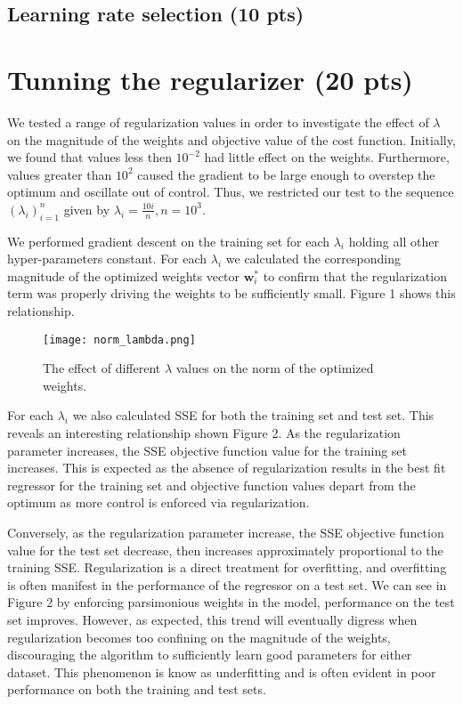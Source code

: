 \documentclass{article}
\renewcommand{\vec}[1]{\mathbf{#1}}
\begin{document}
\subsection{Learning rate selection (10 pts)}

\section{Tunning the regularizer (20 pts)}

We tested a range of regularization values in order to investigate the effect of $\lambda$ on the magnitude of the weights and objective value of the cost function. Initially, we found that values less then $10^{-2}$ had little effect on the weights. Furthermore, values greater than $10^2$ caused the gradient to be large enough to overstep the optimum and oscillate out of control. Thus, we restricted our test to the sequence $(\lambda_i)_{i=1}^{n}$ given by $\lambda_i = \frac{10i}{n}, n = 10^3$.

We performed gradient descent on the training set for each $\lambda_i$ holding all other hyper-parameters constant. For each $\lambda_i$ we calculated the corresponding magnitude of the optimized weights vector $\vec{w}_i^*$ to confirm that the regularization term was properly driving the weights to be sufficiently small. Figure 1 shows this relationship.

\begin{figure}[t]
\centering
\texttt{[image: norm\_lambda.png]}
\caption{The effect of different $\lambda$ values on the norm of the optimized weights.}
\end{figure}

For each $\lambda_i$ we also calculated SSE for both the training set and test set. This reveals an interesting relationship shown Figure 2. As the regularization parameter increases, the SSE objective function value for the training set increases. This is expected as the absence of regularization results in the best fit regressor for the training set and objective function values depart from the optimum as more control is enforced via regularization. 

Conversely, as the regularization parameter increase, the SSE objective function value for the test set decrease, then increases approximately proportional to the training SSE. Regularization is a direct treatment for overfitting, and overfitting is often manifest in the performance of the regressor on a test set. We can see in Figure 2 by enforcing parsimonious weights in the model, performance on the test set improves. However, as expected, this trend will eventually digress when regularization becomes too confining on the magnitude of the weights, discouraging the algorithm to sufficiently learn good parameters for either dataset. This phenomenon is know as underfitting and is often evident in poor performance on both the training and test sets.
\end{document}
